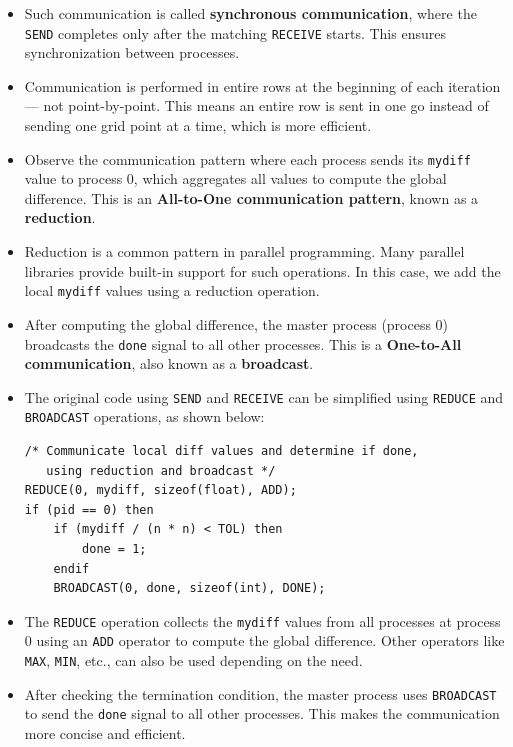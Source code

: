 \documentclass[12pt]{book}
\begin{document}
\begin{itemize}
    \item Such communication is called \textbf{synchronous communication}, where the \texttt{SEND} completes only after the matching \texttt{RECEIVE} starts. This ensures synchronization between processes.

    \item Communication is performed in entire rows at the beginning of each iteration — not point-by-point. This means an entire row is sent in one go instead of sending one grid point at a time, which is more efficient.

    \item Observe the communication pattern where each process sends its \texttt{mydiff} value to process 0, which aggregates all values to compute the global difference. This is an \textbf{All-to-One communication pattern}, known as a \textbf{reduction}.

    \item Reduction is a common pattern in parallel programming. Many parallel libraries provide built-in support for such operations. In this case, we add the local \texttt{mydiff} values using a reduction operation.

    \item After computing the global difference, the master process (process 0) broadcasts the \texttt{done} signal to all other processes. This is a \textbf{One-to-All communication}, also known as a \textbf{broadcast}.

    \item The original code using \texttt{SEND} and \texttt{RECEIVE} can be simplified using \texttt{REDUCE} and \texttt{BROADCAST} operations, as shown below:

\begin{lstlisting}[style=cppstyle]
/* Communicate local diff values and determine if done,
   using reduction and broadcast */
REDUCE(0, mydiff, sizeof(float), ADD);
if (pid == 0) then
    if (mydiff / (n * n) < TOL) then
        done = 1;
    endif
    BROADCAST(0, done, sizeof(int), DONE);
\end{lstlisting}

    \item The \texttt{REDUCE} operation collects the \texttt{mydiff} values from all processes at process 0 using an \texttt{ADD} operator to compute the global difference. Other operators like \texttt{MAX}, \texttt{MIN}, etc., can also be used depending on the need.

    \item After checking the termination condition, the master process uses \texttt{BROADCAST} to send the \texttt{done} signal to all other processes. This makes the communication more concise and efficient.
\end{itemize}
\end{document}
